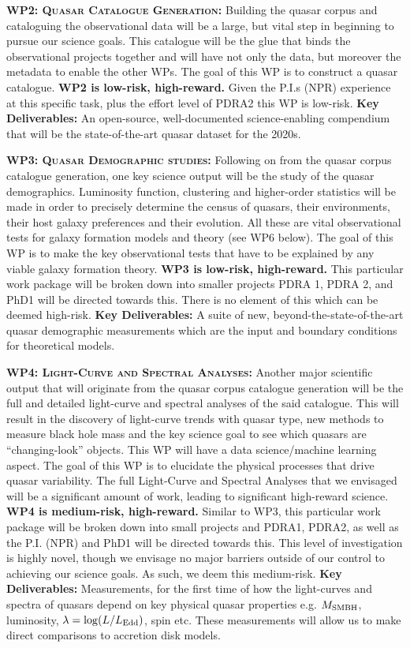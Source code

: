 \documentclass[oneside, a4paper, onecolumn, 11pt]{article}
\begin{document}
\smallskip
\smallskip
\noindent
\textbf{\textsc{WP2: Quasar Catalogue Generation:}} 
Building the quasar corpus and cataloguing the observational data will
be a large, but vital step in beginning to pursue our science
goals. This catalogue will be the glue that binds the observational
projects together and will have not only the data, but moreover the
metadata to enable the other WPs.
The goal of this WP is to construct a quasar catalogue.
{\bf WP2 is low-risk, high-reward.}
Given the P.I.s (NPR) experience at this
specific task, plus the effort level of PDRA2 this WP is low-risk. 
{\bf Key Deliverables:} An open-source, well-documented science-enabling compendium that
will be the state-of-the-art quasar dataset for the 2020s. 


\smallskip
\smallskip
\noindent
\textbf{\textsc{WP3: Quasar Demographic studies:}} 
Following on from the quasar corpus catalogue generation, one key
science output will be the study of the quasar demographics.
Luminosity function, clustering and higher-order statistics will be
made in order to precisely determine the census of quasars, their
environments, their host galaxy preferences and their evolution. All
these are vital observational tests for galaxy formation models and
theory (see WP6 below).  The goal of this WP is to make the key
observational tests that have to be explained by any viable galaxy
formation theory.
{\bf WP3 is low-risk, high-reward.}
This particular work package will be broken down into smaller projects
PDRA 1, PDRA 2, and PhD1 will be directed towards this. 
There is no element of this which can be deemed high-risk.
{\bf Key Deliverables:} A suite of new, beyond-the-state-of-the-art 
quasar demographic measurements which are the input 
and boundary conditions for theoretical models. 


\smallskip
\smallskip
\noindent
\textbf{\textsc{WP4: Light-Curve and Spectral Analyses:}} 
Another major scientific output that will originate from the quasar
corpus catalogue generation will be the full and detailed light-curve
and spectral analyses of the said catalogue. This will result in the
discovery of light-curve trends with quasar type, new methods to
measure black hole mass and the key science goal to see which quasars
are ``changing-look'' objects. This WP will have a data
science/machine learning aspect.  The goal of this WP is to elucidate
the physical processes that drive quasar variability.  The full
Light-Curve and Spectral Analyses that we envisaged will be a
significant amount of work, leading to significant high-reward
science.  {\bf WP4 is medium-risk, high-reward.}  Similar to WP3, this
particular work package will be broken down into small projects and
PDRA1, PDRA2, as well as the P.I. (NPR) and PhD1 will be directed
towards this. This level of investigation is highly novel, though we
envisage no major barriers outside of our control to achieving our
science goals. As such, we deem this medium-risk.  {\bf Key
Deliverables:} Measurements, for the first time of how the
light-curves and spectra of quasars depend on key physical quasar
properties e.g. $M_{\rm SMBH}$, luminosity, $\lambda = \log (L /
L_{\rm Edd})$, spin etc.  These measurements will allow us to make
direct comparisons to accretion disk models.
\end{document}
